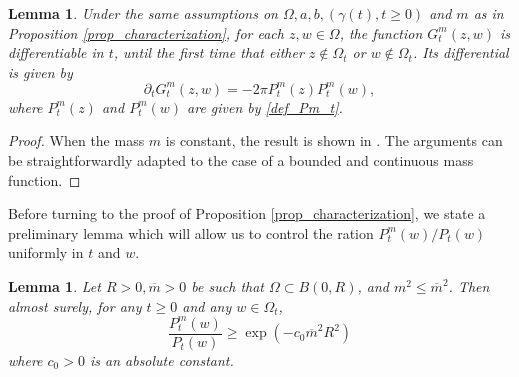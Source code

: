 \documentclass{article}
\newtheorem{lemma}[theorem]{Lemma}
\theoremstyle{definition}
\theoremstyle{remark}
\theoremstyle{remark}
\begin{document}
\begin{lemma} \label{lemma_massive_Hadamard}
Under the same assumptions on  $\Omega,a,b,(\gamma(t),t\ge 0)$ and $m$ as in Proposition \ref{prop_characterization}, for each $z, w \in \Omega$, the function $G_t^m(z,w)$ is differentiable in $t$, until the first time that either $z \notin \Omega_t$ or $w \notin \Omega_t$. Its differential is given by
\begin{equation*}
    \partial_t G_t^m(z,w) = -2\pi P_t^m(z)P_t^m(w),
\end{equation*}
where $P_t^m(z)$ and $P_t^m(w)$ are given by \eqref{def_Pm_t}.
\end{lemma}

\begin{proof}
When the mass $m$ is constant, the result is shown in \cite[Lemma~4.7]{mLERW}. The arguments can be straightforwardly adapted to the case of a bounded and continuous mass function.
\end{proof}

Before turning to the proof of Proposition \ref{prop_characterization}, we state a preliminary lemma which will allow us to control the ration $P_t^m(w)/P_t(w)$ uniformly in $t$ and $w$.

\begin{lemma} \label{lemma_controlPm}
Let $R>0, \overline{m}>0$ be such that $\Omega \subset B(0,R)$, and $m^2\le \overline{m}^2$. Then almost surely, for any $t \geq 0$ and any $w \in \Omega_t$,
\begin{equation*}
    \frac{P_{t}^m(w)}{P_{t}(w)} \geq \exp(-c_0\overline{m}^2R^2)
\end{equation*}
where $c_0 > 0$ is an absolute constant.
\end{lemma}
\end{document}
